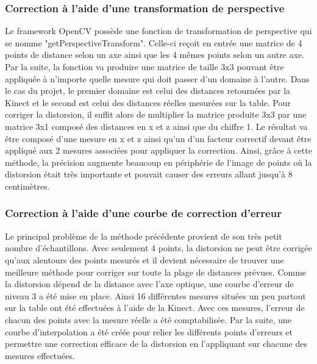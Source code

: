 \subsubsection{Correction à l'aide d'une transformation de perspective}
Le framework OpenCV possède une fonction de transformation de perspective qui se nomme "getPerspectiveTransform". Celle-ci reçoit en entrée une matrice de 4 points de distance selon un axe ainsi que les 4 mêmes points selon un autre axe. Par la suite, la fonction va produire une matrice de taille 3x3 pouvant être appliquée à n'importe quelle mesure qui doit passer d'un domaine à l'autre. Dans le cas du projet, le premier domaine est celui des distances retournées par la Kinect et le second est celui des distances réelles mesurées sur la table. Pour corriger la distorsion, il suffit alors de multiplier la matrice produite 3x3 par une matrice 3x1 composé des distances en x et z ainsi que du chiffre 1. Le résultat va être composé d'une mesure en x et z ainsi qu'un d'un facteur correctif devant être appliqué aux 2 mesures associées pour appliquer la correction. Ainsi, grâce à cette méthode, la précision augmente beaucoup en périphérie de l'image de points où la distorsion était très importante et pouvait causer des erreurs allant jusqu'à 8 centimètres.

\subsubsection{Correction à l'aide d'une courbe de correction d'erreur}
\label{s:distortion}
Le principal problème de la méthode précédente provient de son très petit nombre d'échantillons. Avec seulement 4 points, la distorsion ne peut être corrigée qu'aux alentours des points mesurés et il devient nécessaire de trouver une meilleure méthode pour corriger sur toute la plage de distances prévues. Comme la distorsion dépend de la distance avec l'axe optique, une courbe d'erreur de niveau 3 a été mise en place. Ainsi 16 différentes mesures situées un peu partout sur la table ont été effectuées à l'aide de la Kinect. Avec ces mesures, l'erreur de chacun des points avec la mesure réelle a été comptabilisée. Par la suite, une courbe d'interpolation a été créée pour relier les différents points d'erreurs et permettre une correction efficace de la distorsion en l'appliquant sur chacune des mesures effectuées.

